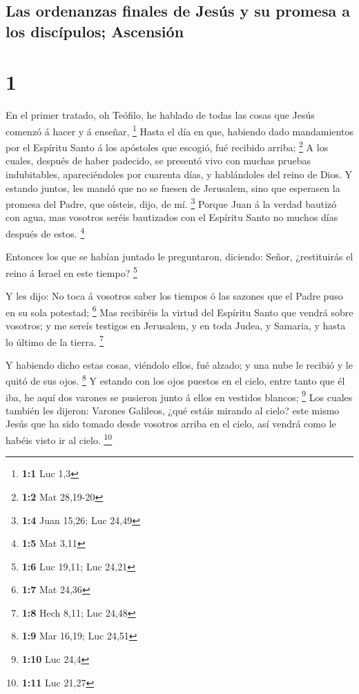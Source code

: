 \hypertarget{las-ordenanzas-finales-de-jesuxfas-y-su-promesa-a-los-discuxedpulos-ascensiuxf3n}{%
\subsection{Las ordenanzas finales de Jesús y su promesa a los
discípulos;
Ascensión}\label{las-ordenanzas-finales-de-jesuxfas-y-su-promesa-a-los-discuxedpulos-ascensiuxf3n}}

\hypertarget{section}{%
\section{1}\label{section}}

 En el primer tratado, oh Teófilo, he hablado de todas las
cosas que Jesús comenzó á hacer y á enseñar, \footnote{\textbf{1:1} Luc
  1,3}  Hasta el día en que, habiendo dado mandamientos
por el Espíritu Santo á los apóstoles que escogió, fué recibido arriba;
\footnote{\textbf{1:2} Mat 28,19-20}  A los cuales,
después de haber padecido, se presentó vivo con muchas pruebas
indubitables, apareciéndoles por cuarenta días, y hablándoles del reino
de Dios.  Y estando juntos, les mandó que no se fuesen de
Jerusalem, sino que esperasen la promesa del Padre, que oísteis, dijo,
de mí. \footnote{\textbf{1:4} Juan 15,26; Luc 24,49} 
Porque Juan á la verdad bautizó con agua, mas vosotros seréis bautizados
con el Espíritu Santo no muchos días después de estos. \footnote{\textbf{1:5}
  Mat 3,11}

 Entonces los que se habían juntado le preguntaron,
diciendo: Señor, ¿restituirás el reino á Israel en este tiempo?
\footnote{\textbf{1:6} Luc 19,11; Luc 24,21}

 Y les dijo: No toca á vosotros saber los tiempos ó las
sazones que el Padre puso en su sola potestad; \footnote{\textbf{1:7}
  Mat 24,36}  Mas recibiréis la virtud del Espíritu Santo
que vendrá sobre vosotros; y me sereís testigos en Jerusalem, y en toda
Judea, y Samaria, y hasta lo último de la tierra. \footnote{\textbf{1:8}
  Hech 8,11; Luc 24,48}

 Y habiendo dicho estas cosas, viéndolo ellos, fué alzado;
y una nube le recibió y le quitó de sus ojos. \footnote{\textbf{1:9} Mar
  16,19; Luc 24,51}  Y estando con los ojos puestos en el
cielo, entre tanto que él iba, he aquí dos varones se pusieron junto á
ellos en vestidos blancos; \footnote{\textbf{1:10} Luc 24,4}
 Los cuales también les dijeron: Varones Galileos, ¿qué
estáis mirando al cielo? este mismo Jesús que ha sido tomado desde
vosotros arriba en el cielo, así vendrá como le habéis visto ir al
cielo. \footnote{\textbf{1:11} Luc 21,27}

